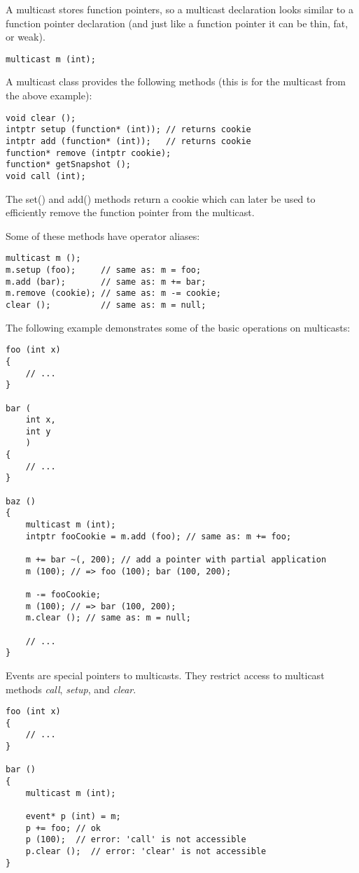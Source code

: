 \documentclass[oneside]{book}
\begin{document}
A multicast stores function pointers, so a multicast declaration looks similar to a function pointer declaration (and just like a function pointer it can be thin, fat, or weak).

\begin{lstlisting}
multicast m (int);
\end{lstlisting}

A multicast class provides the following methods (this is for the multicast from the above example):

\begin{lstlisting}
void clear ();
intptr setup (function* (int)); // returns cookie
intptr add (function* (int));   // returns cookie
function* remove (intptr cookie);
function* getSnapshot ();
void call (int);
\end{lstlisting}

The set() and add() methods return a cookie which can later be used to efficiently remove the function pointer from the multicast.

Some of these methods have operator aliases:

\begin{lstlisting}
multicast m ();
m.setup (foo);     // same as: m = foo;
m.add (bar);       // same as: m += bar;
m.remove (cookie); // same as: m -= cookie;
clear ();          // same as: m = null;
\end{lstlisting}

The following example demonstrates some of the basic operations on multicasts:

\begin{lstlisting}
foo (int x)
{
    // ...
}

bar (
    int x, 
    int y   
    )
{
    // ...
}

baz ()
{
    multicast m (int);
    intptr fooCookie = m.add (foo); // same as: m += foo;

    m += bar ~(, 200); // add a pointer with partial application
    m (100); // => foo (100); bar (100, 200);

    m -= fooCookie;
    m (100); // => bar (100, 200);
    m.clear (); // same as: m = null;

    // ...
}
\end{lstlisting}

Events are special pointers to multicasts. They restrict access to multicast methods \emph{call}, \emph{setup}, and \emph{clear}.

\begin{lstlisting}
foo (int x)
{
    // ...
}

bar ()
{
    multicast m (int);

    event* p (int) = m;
    p += foo; // ok
    p (100);  // error: 'call' is not accessible
    p.clear ();  // error: 'clear' is not accessible
}
\end{lstlisting}
\end{document}
